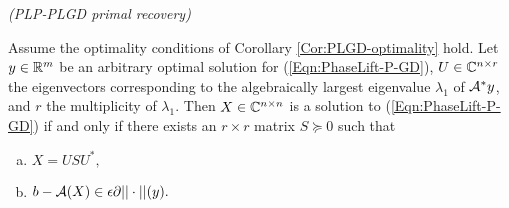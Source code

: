 \begin{cor} 		\label{Cor:PLGD-primal_recovery_refinement}
\emph{(PLP-PLGD primal recovery)}

Assume the optimality conditions of Corollary \ref{Cor:PLGD-optimality} hold. Let $y \in {\mathbb R}^m$ be an arbitrary optimal solution for (\ref{Eqn:PhaseLift-P-GD}),  $U \in {\mathbb C}^{n \times r}$ the eigenvectors corresponding to the algebraically largest eigenvalue $\lambda_1$ of ${\mathcal A}^*y$, and $r$ the multiplicity of $\lambda_1$.  Then $X \in {\mathbb C}^{n \times n}$ is a solution to (\ref{Eqn:PhaseLift-P-GD}) if and only if there exists an $r \times r$ matrix $S \succeq 0$ such that
\begin{enumerate}[(a)]
\item
$X = USU^*,$
\item
$b - {\mathcal A}(X) \in \epsilon \partial ||\cdot||(y).$
\end{enumerate}
\end{cor}

